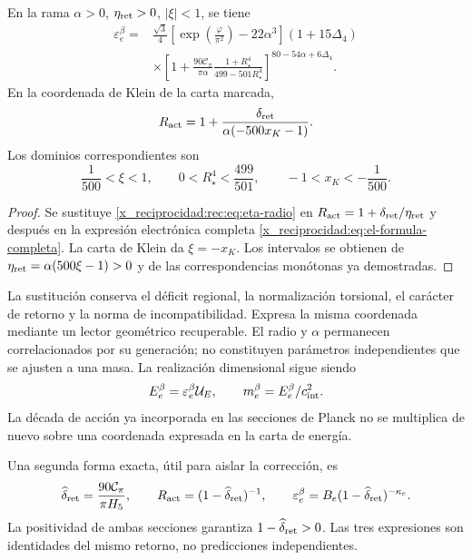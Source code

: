 \begin{corollary}
\label{x_reciprocidad:rec:cor:electron}
En la rama \(\alpha>0\), \(\eta_{\rm ret}>0\), \(|\xi|<1\), se tiene
\begin{align}
 \varepsilon_e^{\beta}={}&
 \frac{\sqrt3}{4}
 \left[\exp\!\left(\frac\varphi{\pi^2}\right)-22\alpha^3\right]
 (1+15\Delta_4)\nonumber\\
 &\times\left[1+\frac{90\mathcal C_\pi}{\pi\alpha}
 \frac{1+R_\star^4}{499-501R_\star^4}\right]^{80-54\alpha+6\Delta_4}.
 \label{x_reciprocidad:rec:eq:electron-radio}
\end{align}
En la coordenada de Klein de la carta marcada,
\begin{equation}
 R_{\rm act}=1+
 \frac{\delta_{\rm ret}}{\alpha(-500x_K-1)}.
 \label{x_reciprocidad:rec:eq:accion-klein}
\end{equation}
Los dominios correspondientes son
\[
 \frac1{500}<\xi<1,\qquad
 0<R_\star^4<\frac{499}{501},\qquad
 -1<x_K<-\frac1{500}.
\]
\end{corollary}
\begin{proof}
Se sustituye \eqref{x_reciprocidad:rec:eq:eta-radio} en \(R_{\rm act}=1+\delta_{\rm ret}/\eta_{\rm ret}\) y después en la expresión electrónica completa \eqref{x_reciprocidad:eq:el-formula-completa}. La carta de Klein da \(\xi=-x_K\). Los intervalos se obtienen de \(\eta_{\rm ret}=\alpha(500\xi-1)>0\) y de las correspondencias monótonas ya demostradas.
\end{proof}

La sustitución conserva el déficit regional, la normalización torsional, el carácter de retorno y la norma de incompatibilidad. Expresa la misma coordenada mediante un lector geométrico recuperable. El radio y \(\alpha\) permanecen correlacionados por su generación; no constituyen parámetros independientes que se ajusten a una masa. La realización dimensional sigue siendo
\[
 E_e^{\beta}=\varepsilon_e^{\beta}\mathcal U_E,\qquad
 m_e^{\beta}=E_e^{\beta}/c_{\rm int}^2.
\]
La década de acción ya incorporada en las secciones de Planck no se multiplica de nuevo sobre una coordenada expresada en la carta de energía.

Una segunda forma exacta, útil para aislar la corrección, es
\[
 \widehat\delta_{\rm ret}=\frac{90\mathcal C_\pi}{\pi H_5},\qquad
 R_{\rm act}=(1-\widehat\delta_{\rm ret})^{-1},\qquad
 \varepsilon_e^{\beta}=B_e(1-\widehat\delta_{\rm ret})^{-\kappa_e}.
\]
La positividad de ambas secciones garantiza \(1-\widehat\delta_{\rm ret}>0\). Las tres expresiones son identidades del mismo retorno, no predicciones independientes.


